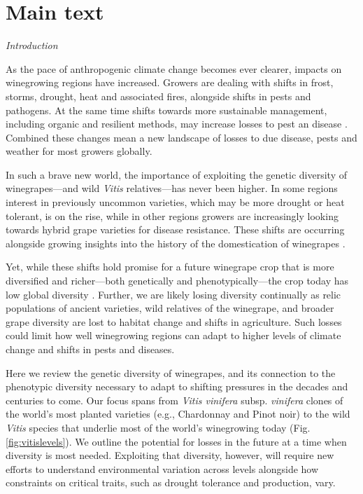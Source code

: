 \documentclass[11pt]{article}
\begin{document}
\newpage
\section{Main text}
\emph{Introduction}

As the pace of anthropogenic climate change becomes ever clearer, impacts on winegrowing regions have increased. Growers are dealing with shifts in frost, storms, drought, heat and associated fires, alongside shifts in pests and pathogens. At the same time shifts towards more sustainable management, including organic and resilient methods, may increase losses to pest an disease \citep[but reduce other environmental costs,][]{doering2019,vanderwerf2020}. Combined these changes mean a new landscape of losses to due disease, pests and weather for most growers globally.   %

In such a brave new world, the importance of exploiting the genetic diversity of winegrapes---and wild \emph{Vitis} relatives---has never been higher. In some regions interest in previously uncommon varieties, which may be more drought or heat tolerant, is on the rise, while in other regions growers are increasingly looking towards hybrid grape varieties for disease resistance. These shifts are occurring alongside growing insights into the history of the domestication of winegrapes \citep[e.g.,][]{ramosmad2019,dong2023}. %

Yet, while these shifts hold promise for a future winegrape crop that is more diversified and richer---both genetically and phenotypically---the crop today has low global diversity \citep{Wolkovich2017,andersonnelgen2021}. Further, we are likely losing diversity continually as relic populations of ancient varieties, wild relatives of the winegrape, and broader grape diversity are lost to habitat change and shifts in agriculture. Such losses could limit how well winegrowing regions can adapt to higher levels of climate change and shifts in pests and diseases. 

Here we review the genetic diversity of winegrapes, and its connection to the phenotypic diversity necessary to adapt to shifting pressures in the decades and centuries to come. Our focus spans from \emph{Vitis vinifera} subsp. \emph{vinifera} clones of the world's most planted varieties (e.g., Chardonnay and Pinot noir) to the wild \emph{Vitis} species that underlie most of the world's winegrowing today (Fig. \ref{fig:vitislevels}). We outline the potential for losses in the future at a time when diversity is most needed. Exploiting that diversity, however, will require new efforts to understand environmental variation across levels alongside how constraints on critical traits, such as drought tolerance and production, vary. %
\end{document}
